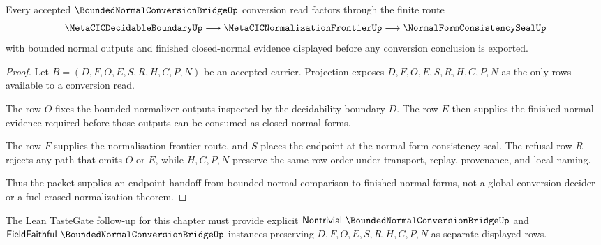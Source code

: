 \begin{theorem}
\label{thm:bounded-normal-conversion-endpoint-handoff}
Every accepted $\BoundedNormalConversionBridgeUp$ conversion read factors through the finite route
$$
\MetaCICDecidableBoundaryUp \longrightarrow \MetaCICNormalizationFrontierUp \longrightarrow \NormalFormConsistencySealUp
$$
with bounded normal outputs and finished closed-normal evidence displayed before any conversion conclusion is exported.
\end{theorem}
\begin{proof}
Let $B=(D,F,O,E,S,R,H,C,P,N)$ be an accepted carrier. Projection exposes $D,F,O,E,S,R,H,C,P,N$ as the only rows available to a conversion read.

The row $O$ fixes the bounded normalizer outputs inspected by the decidability boundary $D$. The row $E$ then supplies the finished-normal evidence required before those outputs can be consumed as closed normal forms.

The row $F$ supplies the normalisation-frontier route, and $S$ places the endpoint at the normal-form consistency seal. The refusal row $R$ rejects any path that omits $O$ or $E$, while $H,C,P,N$ preserve the same row order under transport, replay, provenance, and local naming.

Thus the packet supplies an endpoint handoff from bounded normal comparison to finished normal forms, not a global conversion decider or a fuel-erased normalization theorem.
\end{proof}



The Lean TasteGate follow-up for this chapter must provide explicit $\mathsf{Nontrivial}\ \BoundedNormalConversionBridgeUp$ and $\mathsf{FieldFaithful}\ \BoundedNormalConversionBridgeUp$ instances preserving $D,F,O,E,S,R,H,C,P,N$ as separate displayed rows.

